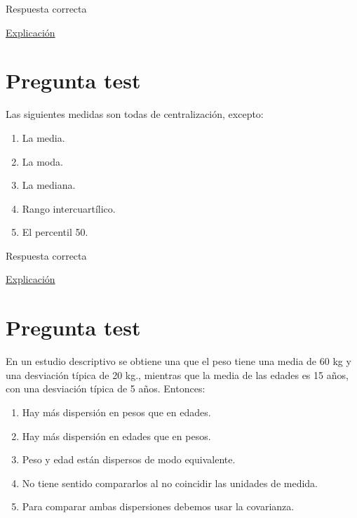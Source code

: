 \documentclass[
]{book}
\providecommand{\tightlist}{%
  \setlength{\itemsep}{0pt}\setlength{\parskip}{0pt}}
\begin{document}
Respuesta correcta

\href{https://1fjmanzano.github.io/bioestadistica/medidas-de-posicio\%CC\%81n-dispersio\%CC\%81n-y-forma.html\#medidas-de-posicio\%CC\%81n-centrales}{Explicación}

\hypertarget{pregunta-test-60}{%
\section{Pregunta test}\label{pregunta-test-60}}

Las siguientes medidas son todas de centralización, excepto:

\begin{enumerate}
\def\labelenumi{\alph{enumi})}
\tightlist
\item
  La media.
\item
  La moda.
\item
  La mediana.
\item
  Rango intercuartílico.
\item
  El percentil 50.
\end{enumerate}

Respuesta correcta

\href{https://1fjmanzano.github.io/bioestadistica/medidas-de-posicio\%CC\%81n-dispersio\%CC\%81n-y-forma.html\#medidas-de-posicio\%CC\%81n-centrales}{Explicación}

\hypertarget{pregunta-test-61}{%
\section{Pregunta test}\label{pregunta-test-61}}

En un estudio descriptivo se obtiene una que el peso tiene una media de 60 kg y una desviación típica de 20 kg., mientras que la media de las edades es 15 años, con una desviación típica de 5 años. Entonces:

\begin{enumerate}
\def\labelenumi{\alph{enumi})}
\tightlist
\item
  Hay más dispersión en pesos que en edades.
\item
  Hay más dispersión en edades que en pesos.
\item
  Peso y edad están dispersos de modo equivalente.
\item
  No tiene sentido compararlos al no coincidir las unidades de medida.
\item
  Para comparar ambas dispersiones debemos usar la covarianza.
\end{enumerate}
\end{document}
